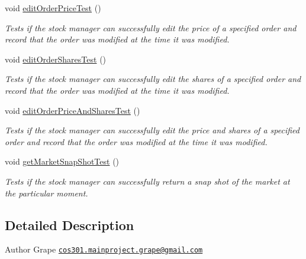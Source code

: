 \begin{DoxyCompactItemize}
void \hyperlink{class_stock_manager_unit_test_a032966cac989c0957d0892ecc36e044c}{edit\+Order\+Price\+Test} ()
\begin{DoxyCompactList}\small\item\em Tests if the stock manager can successfully edit the price of a specified order and record that the order was modified at the time it was modified. \end{DoxyCompactList}\item 
void \hyperlink{class_stock_manager_unit_test_acc4a5199c1125e57cdac3af21609e036}{edit\+Order\+Shares\+Test} ()
\begin{DoxyCompactList}\small\item\em Tests if the stock manager can successfully edit the shares of a specified order and record that the order was modified at the time it was modified. \end{DoxyCompactList}\item 
void \hyperlink{class_stock_manager_unit_test_aea75707233ddc04a4cc197fde0f1dc57}{edit\+Order\+Price\+And\+Shares\+Test} ()
\begin{DoxyCompactList}\small\item\em Tests if the stock manager can successfully edit the price and shares of a specified order and record that the order was modified at the time it was modified. \end{DoxyCompactList}\item 
void \hyperlink{class_stock_manager_unit_test_a0ae4e7ac78f29c3f1d3a8a36571bccd3}{get\+Market\+Snap\+Shot\+Test} ()
\begin{DoxyCompactList}\small\item\em Tests if the stock manager can successfully return a snap shot of the market at the particular moment. \end{DoxyCompactList}\end{DoxyCompactItemize}


\subsection{Detailed Description}
\begin{DoxyAuthor}{Author}
Grape \href{mailto:cos301.mainproject.grape@gmail.com}{\tt cos301.\+mainproject.\+grape@gmail.\+com} 
\end{DoxyAuthor}


